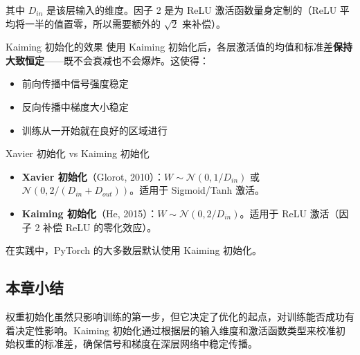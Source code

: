 其中 $D_{in}$ 是该层输入的维度。因子 2 是为 ReLU 激活函数量身定制的（ReLU 平均将一半的值置零，所以需要额外的 $\sqrt{2}$ 来补偿）。

\begin{importantbox}{Kaiming 初始化的效果}
使用 Kaiming 初始化后，各层激活值的均值和标准差\textbf{保持大致恒定}——既不会衰减也不会爆炸。这使得：
\begin{itemize}
    \item 前向传播中信号强度稳定
    \item 反向传播中梯度大小稳定
    \item 训练从一开始就在良好的区域进行
\end{itemize}
\end{importantbox}

\begin{knowledgebox}{Xavier 初始化 vs Kaiming 初始化}
\begin{itemize}
    \item \textbf{Xavier 初始化}（Glorot, 2010）：$W \sim \mathcal{N}(0, 1/D_{in})$ 或 $\mathcal{N}(0, 2/(D_{in} + D_{out}))$。适用于 Sigmoid/Tanh 激活。
    \item \textbf{Kaiming 初始化}（He, 2015）：$W \sim \mathcal{N}(0, 2/D_{in})$。适用于 ReLU 激活（因子 2 补偿 ReLU 的零化效应）。
\end{itemize}
在实践中，PyTorch 的大多数层默认使用 Kaiming 初始化。
\end{knowledgebox}

\subsection{本章小结}

权重初始化虽然只影响训练的第一步，但它决定了优化的起点，对训练能否成功有着决定性影响。Kaiming 初始化通过根据层的输入维度和激活函数类型来校准初始权重的标准差，确保信号和梯度在深层网络中稳定传播。


